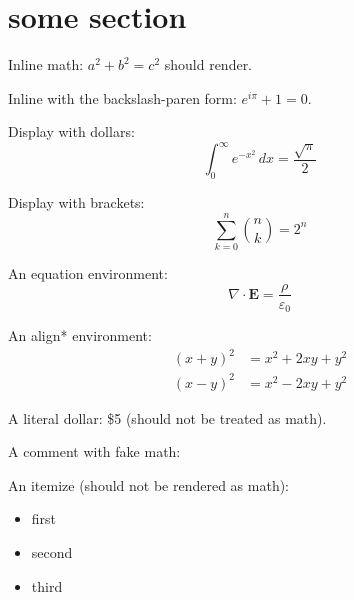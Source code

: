 \documentclass{article}
\begin{document}
\section{some section}


Inline math: $a^2 + b^2 = c^2$ should render.

Inline with the backslash-paren form: \(e^{i\pi} + 1 = 0\).

Display with dollars:
$$
    \int_0^\infty e^{-x^2}\,dx = \frac{\sqrt{\pi}}{2}
$$

Display with brackets:
\[
    \sum_{k=0}^{n} \binom{n}{k} = 2^n
\]

An equation environment:
\begin{equation}
    \nabla \cdot \mathbf{E} = \frac{\rho}{\varepsilon_0}
\end{equation}

An align* environment:
\begin{align*}
    (x+y)^2 & = x^2 + 2xy + y^2 \\
    (x-y)^2 & = x^2 - 2xy + y^2
\end{align*}

A literal dollar: \$5 (should not be treated as math).

A comment with fake math: %

An itemize (should not be rendered as math):
\begin{itemize}
    \item first
    \item second
    \item third
\end{itemize}
\end{document}
